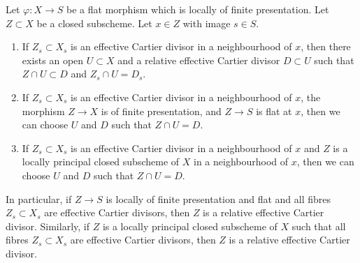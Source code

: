 \begin{lemma}
\label{lemma-fibre-Cartier}
Let $\varphi : X \to S$ be a flat morphism which is locally of finite
presentation. Let $Z \subset X$ be a closed subscheme.
Let $x \in Z$ with image $s \in S$.
\begin{enumerate}
\item If $Z_s \subset X_s$ is an effective Cartier divisor
in a neighbourhood of $x$,
then there exists an open $U \subset X$ and a
relative effective Cartier divisor $D \subset U$ such that
$Z \cap U \subset D$ and $Z_s \cap U = D_s$.
\item If $Z_s \subset X_s$ is an effective Cartier divisor
in a neighbourhood of $x$,
the morphism $Z \to X$ is of finite presentation, and $Z \to S$ is flat at
$x$, then we can choose $U$ and $D$ such that $Z \cap U = D$.
\item If $Z_s \subset X_s$ is an effective Cartier divisor
in a neighbourhood of $x$
and $Z$ is a locally principal closed subscheme of $X$ in a neighbourhood
of $x$, then we can choose $U$ and $D$ such that $Z \cap U = D$.
\end{enumerate}
In particular, if $Z \to S$ is locally of finite presentation and flat and
all fibres $Z_s \subset X_s$ are effective Cartier divisors, then
$Z$ is a relative effective Cartier divisor. Similarly, if $Z$
is a locally principal closed subscheme of $X$ such that all fibres
$Z_s \subset X_s$ are effective Cartier divisors, then
$Z$ is a relative effective Cartier divisor.
\end{lemma}

